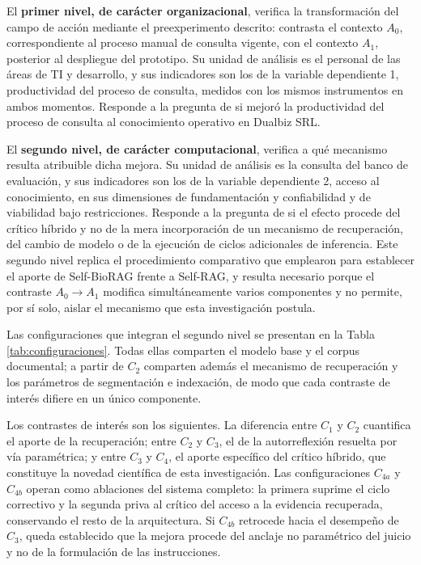 El \textbf{primer nivel, de carácter organizacional}, verifica la transformación del campo de acción mediante el preexperimento descrito: contrasta el contexto $A_0$, correspondiente al proceso manual de consulta vigente, con el contexto $A_1$, posterior al despliegue del prototipo. Su unidad de análisis es el personal de las áreas de TI y desarrollo, y sus indicadores son los de la variable dependiente 1, productividad del proceso de consulta, medidos con los mismos instrumentos en ambos momentos. Responde a la pregunta de si mejoró la productividad del proceso de consulta al conocimiento operativo en Dualbiz SRL.

El \textbf{segundo nivel, de carácter computacional}, verifica a qué mecanismo resulta atribuible dicha mejora. Su unidad de análisis es la consulta del banco de evaluación, y sus indicadores son los de la variable dependiente 2, acceso al conocimiento, en sus dimensiones de fundamentación y confiabilidad y de viabilidad bajo restricciones. Responde a la pregunta de si el efecto procede del crítico híbrido y no de la mera incorporación de un mecanismo de recuperación, del cambio de modelo o de la ejecución de ciclos adicionales de inferencia. Este segundo nivel replica el procedimiento comparativo que \textcite{jeong_improving_2024} emplearon para establecer el aporte de Self-BioRAG frente a Self-RAG, y resulta necesario porque el contraste $A_0 \rightarrow A_1$ modifica simultáneamente varios componentes y no permite, por sí solo, aislar el mecanismo que esta investigación postula.

Las configuraciones que integran el segundo nivel se presentan en la Tabla \ref{tab:configuraciones}. Todas ellas comparten el modelo base y el corpus documental; a partir de $C_2$ comparten además el mecanismo de recuperación y los parámetros de segmentación e indexación, de modo que cada contraste de interés difiere en un único componente.



Los contrastes de interés son los siguientes. La diferencia entre $C_1$ y $C_2$ cuantifica el aporte de la recuperación; entre $C_2$ y $C_3$, el de la autorreflexión resuelta por vía paramétrica; y entre $C_3$ y $C_4$, el aporte específico del crítico híbrido, que constituye la novedad científica de esta investigación. Las configuraciones $C_{4a}$ y $C_{4b}$ operan como ablaciones del sistema completo: la primera suprime el ciclo correctivo y la segunda priva al crítico del acceso a la evidencia recuperada, conservando el resto de la arquitectura. Si $C_{4b}$ retrocede hacia el desempeño de $C_3$, queda establecido que la mejora procede del anclaje no paramétrico del juicio y no de la formulación de las instrucciones.

